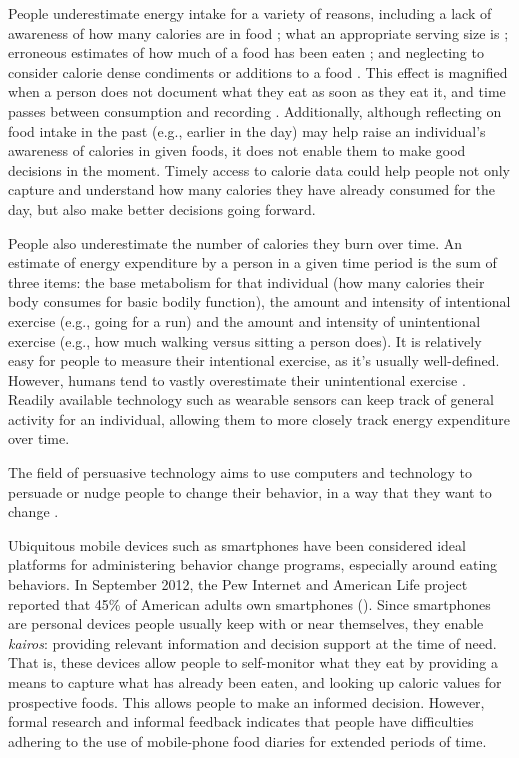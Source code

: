 People underestimate energy intake for a variety of reasons, including a lack of awareness of how many calories are in food \citep{Zegman1984}; what an appropriate serving size is \citep{Young2009, beasley_accuracy_2005}; erroneous estimates of how much of a food has been eaten \citep{beasley_accuracy_2005}; and neglecting to consider calorie dense condiments or additions to a food \citep{Zegman1984}. This effect is magnified when a person does not document what they eat as soon as they eat it, and time passes between consumption and recording \citep{Baranowski1994}. Additionally, although reflecting on food intake in the past (e.g., earlier in the day) may help raise an individual's awareness of calories in given foods, it does not enable them to make good decisions in the moment. Timely access to calorie data could help people not only capture and understand how many calories they have already consumed for the day, but also make better decisions going forward. 

People also underestimate the number of calories they burn over time. An estimate of energy expenditure by a person in a given time period is the sum of three items: the base metabolism for that individual (how many calories their body consumes for basic bodily function), the amount and intensity of intentional exercise (e.g., going for a run) and the amount and intensity of unintentional exercise (e.g., how much walking versus sitting a person does). It is relatively easy for people to measure their intentional exercise, as it's usually well-defined. However, humans tend to vastly overestimate their unintentional exercise \citep{Duncan2001}. Readily available technology such as wearable sensors can keep track of general activity for an individual, allowing them to more closely track energy expenditure over time. 

The field of persuasive technology aims to use computers and technology to persuade or nudge people to change their behavior, in a way that they want to change \citep{Fogg2002}. 

Ubiquitous mobile devices such as smartphones have been considered ideal platforms for administering behavior change programs, especially around eating behaviors. In September 2012, the Pew Internet and American Life project reported that 45\% of American adults own smartphones (\citep{}). Since smartphones are personal devices people usually keep with or near themselves, they enable \textit{kairos}: providing relevant information and decision support at the time of need. That is, these devices allow people to self-monitor what they eat by providing a means to capture what has already been eaten, and looking up caloric values for prospective foods. This allows people to make an informed decision. However, formal research and informal feedback indicates that people have difficulties adhering to the use of mobile-phone food diaries for extended periods of time. 

